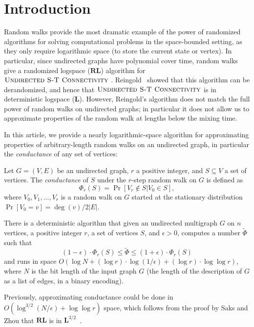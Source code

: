 \documentclass{toc}
\newcommand{\wt}{\widetilde}   %
\newcommand{\SC}{O(\log N + (\log r)\cdot\log(1/\epsilon)+(\log r)\cdot \log\log r)}
\newcommand{\class}[1]{\mathbf{#1}}
\newcommand{\RL}{\class{RL}}
\renewcommand{\L}{\class{L}}
\def\textprob#1{\textmd{\textsc{#1}}}
\newcommand{\USTConn}{\textprob{Undirected S-T Connectivity}}
\numberwithin{myalgctr}{section}
\theoremstyle{named}
\begin{document}
%
%
%


\section{Introduction}
\label{sect:intro}
Random walks provide the most dramatic example of the power of randomized algorithms for solving computational problems in the space-bounded setting, as they only require logarithmic space (to store the current state or vertex). In particular, since undirected graphs have polynomial cover time, random walks give a randomized logspace ($\RL$) algorithm for $\USTConn$ \cite{AleliunasKaLiLoRa79}. Reingold~\cite{Reingold08} showed that this algorithm can be derandomized, and hence that $\USTConn$ is in deterministic logspace ($\L$). However, Reingold's algorithm does not match the full power of random walks on undirected graphs; in particular it does not allow us to approximate properties of the random walk at lengths below the mixing time. 

In this %
article,  %
we provide a nearly logarithmic-space algorithm for approximating properties of arbitrary-length random walks on an undirected graph, in particular the \emph{conductance} of any set of vertices:

\begin{definition}
Let $G=(V,E)$ be an undirected graph, $r$ a positive integer, and $S\subseteq V$ a set of vertices.  The \emph{conductance} of $S$ under the $r$-step random walk on $G$ is defined as 
\[
\Phi_r(S)=\Pr[V_r\not \in S | V_0\in S],
\]
where $V_0,V_1,\ldots,V_r$ is a random walk on $G$ started at the stationary distribution  $\Pr[V_0=v]=\deg(v)/2|E|$.
\end{definition}

\begin{theorem}
\label{thm:conductance}
There is a deterministic algorithm that given an undirected multigraph $G$ on $n$ vertices, a positive integer $r$, a set of vertices $S$, and $\epsilon>0$, computes a number $\wt{\Phi}$ such that
\[
(1-\epsilon)\cdot \Phi_r(S) \leq \wt{\Phi} \leq (1+\epsilon)\cdot \Phi_r(S)
\]
and runs in space $\SC$, where $N$ is the bit length of the input graph $G$ (the length of the description of $G$ as a list of edges, in a binary encoding). 
\end{theorem}

Previously, approximating conductance could be done in $O(\log^{3/2}(N/\epsilon)+\log\log r)$ space, which follows from
%
%
the proof by Saks and Zhou that $\RL$ is in $\L^{3/2}$~\cite{SaksZh99}.  
\end{document}
